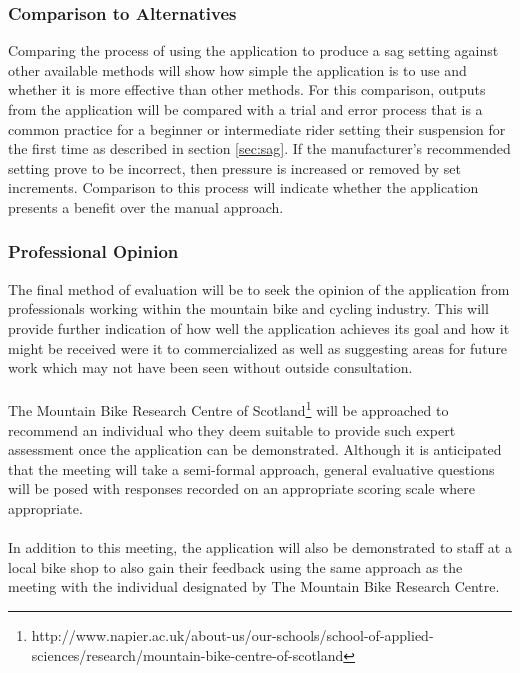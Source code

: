		\subsubsection{Comparison to Alternatives}\label{sec:methodology_manual}
			Comparing the process of using the application to produce a sag setting against other available methods will show how simple the application is to use and whether it is more effective than other methods. For this comparison, outputs from the application will be compared with a trial and error process that is a common practice for a beginner or intermediate rider setting their suspension for the first time as described in section \ref{sec:sag}. If the manufacturer's recommended setting prove to be incorrect, then pressure is increased or removed by set increments. Comparison to this process will indicate whether the application presents a benefit over the manual approach.
		\subsubsection{Professional Opinion}\label{sec:methodology_professional_opinion}
			The final method of evaluation will be to seek the opinion of the application from professionals working within the mountain bike and cycling industry. This will provide further indication of how well the application achieves its goal and how it might be received were it to commercialized as well as suggesting areas for future work which may not have been seen without outside consultation.
			\\\\
			The Mountain Bike Research Centre of Scotland\footnote{http://www.napier.ac.uk/about-us/our-schools/school-of-applied-sciences/research/mountain-bike-centre-of-scotland} will be approached to recommend an individual who they deem suitable to provide such expert assessment once the application can be demonstrated. Although it is anticipated that the meeting will take a semi-formal approach, general evaluative questions will be posed with responses recorded on an appropriate scoring scale where appropriate. 
			\\\\
			In addition to this meeting, the application will also be demonstrated to staff at a local bike shop to also gain their feedback using the same approach as the meeting with the individual designated by The Mountain Bike Research Centre.